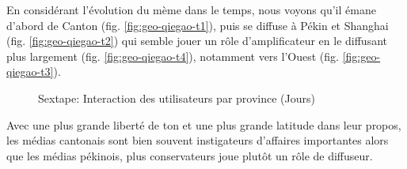 En consid\'erant l{\textquoteright}\'evolution du m\`eme dans le temps,
nous voyons qu{\textquoteright}il \'emane d{\textquoteright}abord de
Canton (fig. \ref{fig:geo-qiegao-t1}), puis se diffuse \`a P\'ekin et Shanghai (fig. \ref{fig:geo-qiegao-t2}) qui semble jouer un r\^ole d{\textquoteright}amplificateur en le diffusant plus largement (fig. \ref{fig:geo-qiegao-t4}), notamment vers l{\textquoteright}Ouest (fig. \ref{fig:geo-qiegao-t3}). 


\begin{figure}[h!]
    \centering
    
  \caption{
    Sextape: Interaction des utilisateurs par province (Jours)
  }
\end{figure}

Avec une plus grande libert\'e de ton et une plus grande latitude dans leur propos, les m\'edias cantonais sont bien souvent instigateurs d{\textquoteright}affaires importantes alors que les m\'edias p\'ekinois, plus conservateurs joue plut\^ot un r\^ole de diffuseur. 

